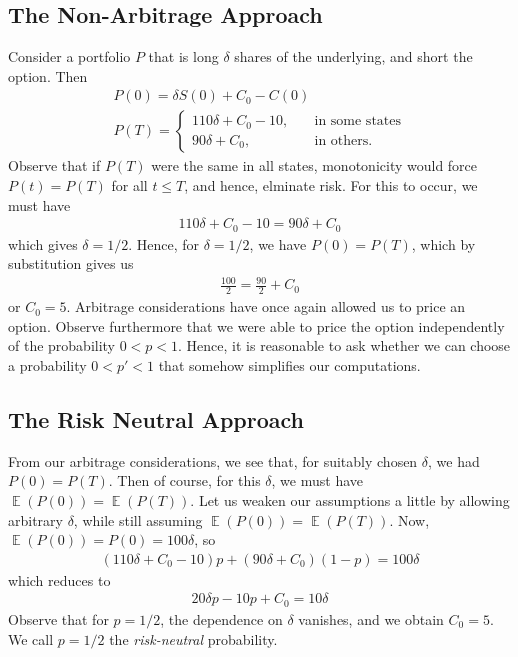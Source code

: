 \documentclass[12pt]{article}
\DeclareMathOperator{\ex}{\mathbb{E}}
\theoremstyle{plain}
\theoremstyle{definition}
\theoremstyle{remark}
\numberwithin{equation}{section}  %
\begin{document}
\subsection{The Non-Arbitrage Approach}
Consider a portfolio $P$
that is long $\delta$ shares of the underlying, and short the option.
Then
\begin{gather*}
		P(0)  = \delta S(0) + C_{0} - C(0)
		\\
		 P(T)  = \begin{cases}
		110 \delta + C_{0} - 10, \quad & \text{in some states}
		\\
		90 \delta + C_{0}, \quad & \text{in others}.
	\end{cases}
	\end{gather*}
	Observe that if $P(T)$ were the same in all states, monotonicity would force
	$P(t) = P(T)$ for all $t \le T$, and hence, elminate risk. For this to occur,
	we must have
	\begin{equation*}
		\begin{split}
			110 \delta + C_{0} - 10 = 90 \delta + C_{0}
		\end{split}
	\end{equation*}
	which gives $\delta = 1/2$. Hence, for $\delta = 1/2$, we have
	$P(0) = P(T)$, which by substitution gives us
	\begin{equation*}
		\begin{split}
			\frac{100}{2} = \frac{90}{2} + C_{0}
		\end{split}
	\end{equation*}
	or $C_{0} = 5$. Arbitrage considerations have once again
	allowed us to price an option. Observe furthermore that we were able
	to price the option independently of the probability $0 < p < 1$. 
	Hence, it is reasonable to ask whether we can choose a probability
	$0 < p' < 1$ that somehow simplifies our computations.
	\subsection{The Risk Neutral Approach}
	From our arbitrage considerations, we see that, for suitably chosen
	$\delta$, we had $P(0) = P(T)$. Then of course, for this $\delta$, we must
	have $\ex(P(0)) = \ex(P(T))$. Let us weaken our assumptions a little by allowing
	arbitrary $\delta$, while still assuming $\ex(P(0)) = \ex(P(T))$. 
	Now, $\ex(P(0)) = P(0) = 100 \delta$, so
	\begin{equation*}
		\begin{split}
			(110 \delta + C_{0} - 10) p + (90 \delta + C_{0}) (1- p) = 100 \delta
		\end{split}
	\end{equation*}
	which reduces to
	\begin{equation*}
		\begin{split}
			20 \delta p - 10p + C_{0} = 10 \delta
		\end{split}
	\end{equation*}
	Observe that for $p = 1/2$, the dependence on $\delta$ vanishes, and we obtain
	$C_{0} = 5$. We call $p = 1/2$ the \emph{risk-neutral} probability.
\end{document}
